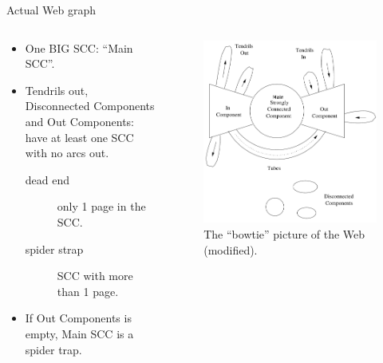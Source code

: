 \documentclass[10pt]{beamer}
\begin{document}
\begin{frame}{Actual Web graph}
  \vspace{-.3cm}
  \begin{columns}
    \begin{column}{0.5\textwidth}
      \begin{itemize}
        \item One BIG SCC: ``Main SCC''.
        \item Tendrils out, Disconnected Components and Out Components:
          have at least one SCC with no arcs out.
          \begin{description}
            \item[dead end] only 1 page in the SCC.
            \item[spider strap] SCC with more than 1 page.
          \end{description}
        \item If Out Components is empty, Main SCC is a spider trap.
      \end{itemize}
    \end{column}
    \begin{column}{0.5\textwidth}
      \begin{figure}
        \includegraphics[trim=.5cm 0cm .2cm 0cm,clip,width=\linewidth]{web-graph.png}
        \caption{The ``bowtie'' picture of the Web \cite[p.~187]{leskovec2014mining} (modified).}
        \label{fig:web-graph}
      \end{figure}
    \end{column}
  \end{columns}
\end{frame}
\end{document}

